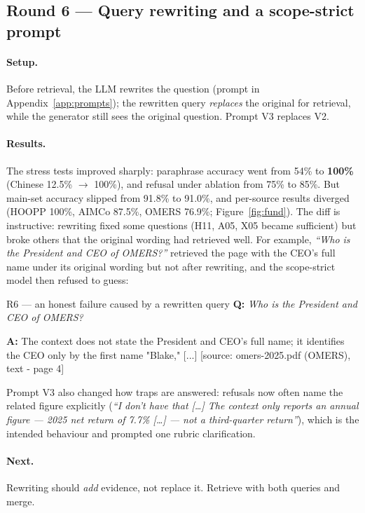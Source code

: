 \documentclass[11pt,a4paper]{article}
\newcommand{\Q}[1]{\noindent\textbf{Q:} \textit{#1}\par\smallskip}
\newcommand{\A}[1]{\noindent\textbf{A:} {\small\ttfamily #1}\par}
\begin{document}
\subsection{Round 6 --- Query rewriting and a scope-strict prompt}
\label{sec:r6}
\paragraph{Setup.} Before retrieval, the LLM rewrites the question (prompt in Appendix~\ref{app:prompts}); the
rewritten query \emph{replaces} the original for retrieval, while the generator still sees the original question.
Prompt V3 replaces V2.

\paragraph{Results.} The stress tests improved sharply: paraphrase accuracy went from 54\% to \textbf{100\%}
(Chinese 12.5\% $\to$ 100\%), and refusal under ablation from 75\% to 85\%. But main-set accuracy slipped from 91.8\%
to 91.0\%, and per-source results diverged (HOOPP 100\%, AIMCo 87.5\%, OMERS 76.9\%; Figure~\ref{fig:fund}).
The diff is instructive: rewriting fixed some questions (H11, A05, X05 became sufficient) but broke others that
the original wording had retrieved well. For example, \emph{``Who is the President and CEO of OMERS?''} retrieved the
page with the CEO's full name under its original wording but not after rewriting, and the scope-strict model then
refused to guess:
\begin{qa}{R6 --- an honest failure caused by a rewritten query}
\Q{Who is the President and CEO of OMERS?}
\A{The context does not state the President and CEO's full name; it identifies the CEO only by the first name "Blake," [...] [source: omers-2025.pdf (OMERS), text - page 4]}
\end{qa}
Prompt V3 also changed how traps are answered: refusals now often name the related figure explicitly
(\emph{``I don't have that [\ldots] The context only reports an annual figure --- 2025 net return of 7.7\% [\ldots] --- not a
third-quarter return''}), which is the intended behaviour and prompted one rubric clarification.

\paragraph{Next.} Rewriting should \emph{add} evidence, not replace it. Retrieve with both queries and merge.
\end{document}
